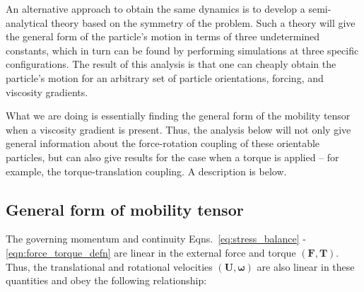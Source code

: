 \documentclass{jfm}
\begin{document}
An alternative approach to obtain the same dynamics is to develop a semi-analytical theory based on the symmetry of the problem.   Such a theory will give the general form of the particle’s motion in terms of three undetermined constants, which in turn can be found by performing simulations at three specific configurations.  The result of this analysis is that one can cheaply obtain the particle’s motion for an arbitrary set of particle orientations, forcing, and viscosity gradients.  

What we are doing is essentially finding the general form of the mobility tensor when a viscosity gradient is present.  Thus, the analysis below will not only give general information about the force-rotation coupling of these orientable particles, but can also give results for the case when a torque is applied – for example, the torque-translation coupling.  A description is below.

\subsection{General form of mobility tensor}

The governing momentum and continuity Eqns.~\eqref{eq:stress_balance} - \eqref{eqn:force_torque_defn} are linear in the external force and torque $(\boldsymbol{F}, \boldsymbol{T})$.  Thus, the translational and rotational velocities  $(\boldsymbol{U},\boldsymbol{\omega})$ are also linear in these quantities and obey the following relationship:




\end{document}
